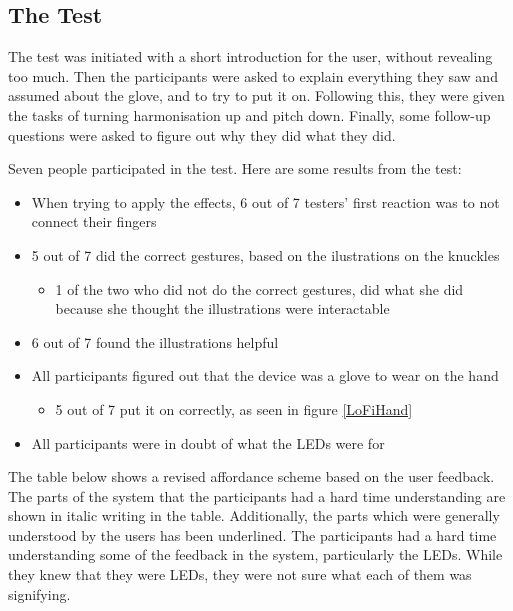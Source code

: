 \subsection{The Test}

The test was initiated with a short introduction for the user, without revealing too much. Then the participants were asked to explain everything they saw and assumed about the glove, and to try to put it on. Following this, they were given the tasks of turning harmonisation up and pitch down. Finally, some follow-up questions were asked to figure out why they did what they did.

Seven people participated in the test. Here are some results from the test:

\begin{itemize}
	\item When trying to apply the effects, 6 out of 7 testers' first reaction was to not connect their fingers
	\item 5 out of 7 did the correct gestures, based on the ilustrations on the knuckles
	\begin{itemize}
		\item 1 of the two who did not do the correct gestures, did what she did because she thought the illustrations were interactable
	\end{itemize}
	\item 6 out of 7 found the illustrations helpful
	\item All participants figured out that the device was a glove to wear on the hand
	\begin{itemize}
		\item 5 out of 7 put it on correctly, as seen in figure \ref{LoFiHand}
	\end{itemize}
	\item All participants were in doubt of what the LEDs were for
\end{itemize}

The table below shows a revised affordance scheme based on the user feedback. The parts of the system that the participants had a hard time understanding are shown in italic writing in the table. Additionally, the parts which were generally understood by the users has been underlined.
The participants had a hard time understanding some of the feedback in the system, particularly the LEDs. While they knew that they were LEDs, they were not sure what each of them was signifying.


